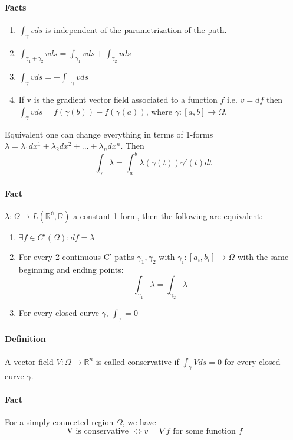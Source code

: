 \documentclass[11pt,a4paper]{book}
\begin{document}
\paragraph*{Facts}
\begin{enumerate}
\item $\int_{\gamma} vds$ is independent of the parametrization of the path.
\item $\int_{\gamma_1+\gamma_2} vds=\int_{\gamma_1} vds+ \int_{\gamma_2} vds$
\item $\int_{\gamma} vds= -\int_{-\gamma} vds$
\item If v  is the gradient vector field associated to a function $f$ i.e. $v=df$ then $\int_{\gamma} vds=f(\gamma(b))-f(\gamma(a))$, where $\gamma: [a,b] \rightarrow \Omega$.
\end{enumerate}
Equivalent one can change everything in terms of 1-forms $\lambda=\lambda_1 dx^1+\lambda_2 dx^2+ ... + \lambda_n dx^n$. Then $$\int_{\gamma} \lambda = \int_a^b \lambda(\gamma(t))\gamma '(t)dt$$
\paragraph*{Fact}
$\lambda: \Omega \rightarrow L(\mathbb{R^n}, \mathbb{R})$ a constant 1-form, then the following are equivalent:
\begin{enumerate}
\item $\exists f \in C'(\Omega) : df=\lambda$
\item For every 2 continuous C'-paths $\gamma_1, \gamma_2$ with $\gamma_i:[a_i,b_i]\rightarrow \Omega$ with the same beginning and ending points:
$$\int_{\gamma_1} \lambda=\int_{\gamma_2} \lambda$$
\item For every closed curve $\gamma$, $\int_{\gamma}=0$
\end{enumerate}
\paragraph*{Definition} A vector field $V:\Omega \rightarrow \mathbb{R}^n$ is called conservative if $\int_{\gamma} Vds=0$ for every closed curve $\gamma$.

\paragraph*{Fact} For a simply connected region $\Omega$, we have
$$\mbox{ V is conservative } \iff v=\nabla f \mbox{ for some function } f$$
\end{document}
